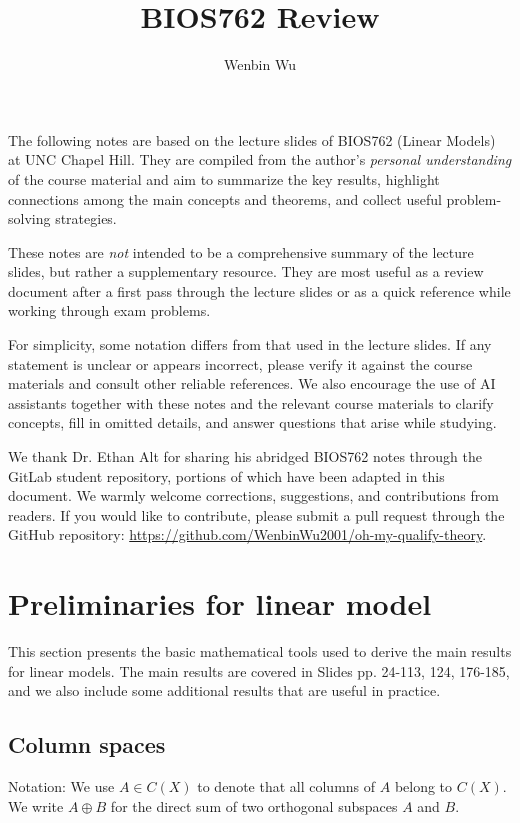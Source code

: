 \documentclass{article}
\author{Wenbin Wu}
\title{BIOS762 Review}
\theoremstyle{break}
\begin{document}
\maketitle


The following notes are based on the lecture slides of BIOS762 (Linear Models) at UNC Chapel Hill. They are compiled from the author's \emph{personal understanding} of the course material and aim to summarize the key results, highlight connections among the main concepts and theorems, and collect useful problem-solving strategies.

These notes are \emph{not} intended to be a comprehensive summary of the lecture slides, but rather a supplementary resource. They are most useful as a review document after a first pass through the lecture slides or as a quick reference while working through exam problems.

For simplicity, some notation differs from that used in the lecture slides. If any statement is unclear or appears incorrect, please verify it against the course materials and consult other reliable references. We also encourage the use of AI assistants together with these notes and the relevant course materials to clarify concepts, fill in omitted details, and answer questions that arise while studying.

We thank Dr. Ethan Alt for sharing his abridged BIOS762 notes through the GitLab student repository, portions of which have been adapted in this document. 
We warmly welcome corrections, suggestions, and contributions from readers. 
If you would like to contribute, please submit a pull request through the GitHub repository: \url{https://github.com/WenbinWu2001/oh-my-qualify-theory}.

\tableofcontents
\newpage

\section{Preliminaries for linear model}\label{sec:prelim-lm}
This section presents the basic mathematical tools used to derive the main results for linear models. The main results are covered in Slides pp. 24-113, 124, 176-185, and we also include some additional results that are useful in practice.

\subsection{Column spaces}\label{sec:prelim-lm-column-spaces}
Notation: 
We use $A \in C(X)$ to denote that all columns of $A$ belong to $C(X)$. 
We write $A \oplus B$ for the direct sum of two orthogonal subspaces $A$ and $B$.
\end{document}
